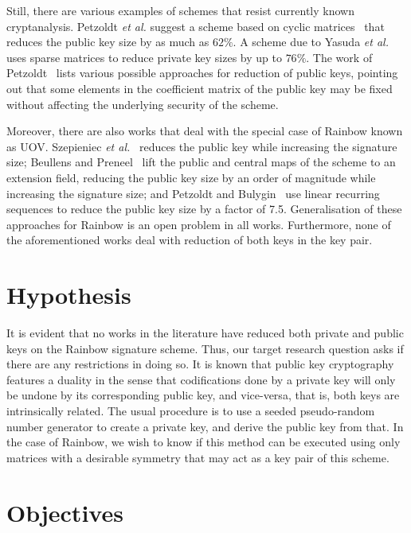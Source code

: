 \documentclass[10pt]{article}
\begin{document}
Still, there are various examples of schemes that resist currently known cryptanalysis. Petzoldt \emph{et al.} suggest a scheme based on cyclic matrices~\cite{Petzoldt:inproc:2010:dec} that reduces the public key size by as much as $62\%$. A scheme due to Yasuda \emph{et al.}~\cite{Yasuda:article:2014:sep} uses sparse matrices to reduce private key sizes by up to $76\%$. The work of Petzoldt~\cite{Petzoldt:phd:2013:jul} lists various possible approaches for reduction of public keys, pointing out that some elements in the coefficient matrix of the public key may be fixed without affecting the underlying security of the scheme. 

Moreover, there are also works that deal with the special case of Rainbow known as UOV. Szepieniec \emph{et al.}~\cite{Szepieniec:inproc:2017:jun} reduces the public key while increasing the signature size; Beullens and Preneel~\cite{Beullens:inproc:2017:dec} lift the public and central maps of the scheme to an extension field, reducing the public key size by an order of magnitude while increasing the signature size; and Petzoldt and Bulygin~\cite{Petzoldt:inproc:2012:nov} use linear recurring sequences to reduce the public key size by a factor of 7.5. Generalisation of these approaches for Rainbow is an open problem in all works. Furthermore, none of the aforementioned works deal with reduction of both keys in the key pair.

\section{Hypothesis}

It is evident that no works in the literature have reduced both private and public keys on the Rainbow signature scheme. Thus, our target research question asks if there are any restrictions in doing so. It is known that public key cryptography features a duality in the sense that codifications done by a private key will only be undone by its corresponding public key, and vice-versa, that is, both keys are intrinsically related. The usual procedure is to use a seeded pseudo-random number generator to create a private key, and derive the public key from that. In the case of Rainbow, we wish to know if this method can be executed using only matrices with a desirable symmetry that may act as a key pair of this scheme. 

\section{Objectives}
\end{document}

